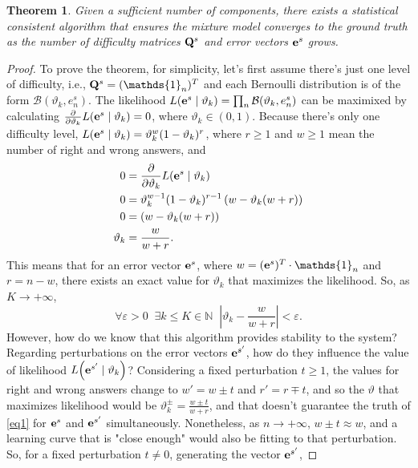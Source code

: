 \documentclass{article}
\newtheorem{theorem}{Theorem}
\newcommand{\0}{\mathbbold{0}}
\newcommand{\1}{\mathds{1}}
\newcommand{\Lh}[2]{L\!\left(#1 \mid #2\right)}
\begin{document}
\begin{theorem}
    Given a sufficient number of components, there exists a statistical consistent algorithm that ensures the mixture model converges to the ground truth as the number of difficulty matrices ${\bf Q}^s$ and error vectors ${\bf e}^s$ grows.
\end{theorem}
\begin{proof}
    To prove the theorem, for simplicity, let's first assume there's just one level of difficulty, i.e., ${\bf Q}^s = (\1_n)^T$ and each Bernoulli distribution is of the form $\mathcal{B}(\vartheta_k, e^s_n)$.
    The likelihood $\Lh{{\bf e}^s}{\vartheta_k} = \prod_n \mathcal{B}(\vartheta_k, e^s_n)$ can be maximixed by calculating $\frac{\partial}{\partial \vartheta_k} \Lh{{\bf e}^s}{\vartheta_k} = 0 $, where $\vartheta_k \in (0,1)$.
    Because there's only one difficulty level, $\Lh{{\bf e}^s}{\vartheta_k} = \vartheta_k^w(1-\vartheta_k)^r$, where $r \ge 1$ and $w \ge 1$ mean the number of right and wrong answers, and
    \begin{align*}
        0 &= \frac{\partial}{\partial \vartheta_k} \Lh{{\bf e}^s}{\vartheta_k} \\
        0 &= \vartheta_k^{w-1}(1-\vartheta_k)^{r-1}\left(w - \vartheta_k(w + r)\right) \\
        0 &= \left(w - \vartheta_k(w + r)\right) \\
        \vartheta_k &= \frac{w}{w+r}.
    \end{align*}
    This means that for an error vector ${\bf e}^s$, where $w = ({\bf e}^s)^T \cdot \1_n$ and $r = n - w$, there exists an exact value for $\vartheta_k$ that maximizes the likelihood.
    So, as $K \rightarrow +\infty$,
    \begin{equation}
        \forall \varepsilon > 0 \;\; \exists k \le K \in \mathbb{N} \;\; \left| \vartheta_k - \frac{w}{w+r} \right| < \varepsilon. \label{eq1}
    \end{equation}
    However, how do we know that this algorithm provides stability to the system? Regarding perturbations on the error vectors ${\bf e}^{s'}$, how do they influence the value of likelihood $\Lh{{\bf e}^{s'}}{\vartheta_k}$?
    Considering a fixed perturbation $t \ge 1$, the values for right and wrong answers change to $w' = w \pm t$ and $r' = r \mp t$, and so the $\vartheta$ that maximizes likelihood would be $\vartheta_k^\pm = \frac{w \pm t}{w+r}$,
    and that doesn't guarantee the truth of \eqref{eq1} for ${\bf e}^s$ and ${\bf e}^{s'}$ simultaneously.
    Nonetheless, as $n \rightarrow +\infty$, $w \pm t \approx w$, and a learning curve that is "close enough" would also be fitting to that perturbation. So, for a fixed perturbation $t \ne 0$, generating the vector ${\bf e}^{s'}$,

\end{proof}
\end{document}
